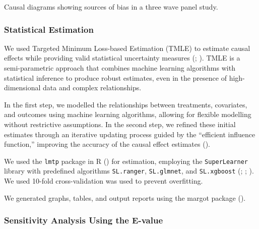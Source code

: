 \documentclass[
  single column]{article}
\begin{document}
\begin{table}

\caption{\label{tbl-02}Causal diagrams showing sources of bias in a
three wave panel study.}

\centering{

\threewavepaneltwo

}

\end{table}%

\subsubsection{Statistical Estimation}\label{statistical-estimation}

We used Targeted Minimum Loss-based Estimation (TMLE) to estimate causal
effects while providing valid statistical uncertainty measures
(;
). TMLE is a
semi-parametric approach that combines machine learning algorithms with
statistical inference to produce robust estimates, even in the presence
of high-dimensional data and complex relationships.

In the first step, we modelled the relationships between treatments,
covariates, and outcomes using machine learning algorithms, allowing for
flexible modelling without restrictive assumptions. In the second step,
we refined these initial estimates through an iterative updating process
guided by the ``efficient influence function,'' improving the accuracy
of the causal effect estimates ().

We used the \texttt{lmtp} package in R
() for estimation,
employing the \texttt{SuperLearner} library with predefined algorithms
\texttt{SL.ranger}, \texttt{SL.glmnet}, and \texttt{SL.xgboost}
(;
;
). We used 10-fold
cross-validation was used to prevent overfitting.

We generated graphs, tables, and output reports using the margot package
().

\subsubsection{Sensitivity Analysis Using the
E-value}\label{sensitivity-analysis-using-the-e-value}
\end{document}
